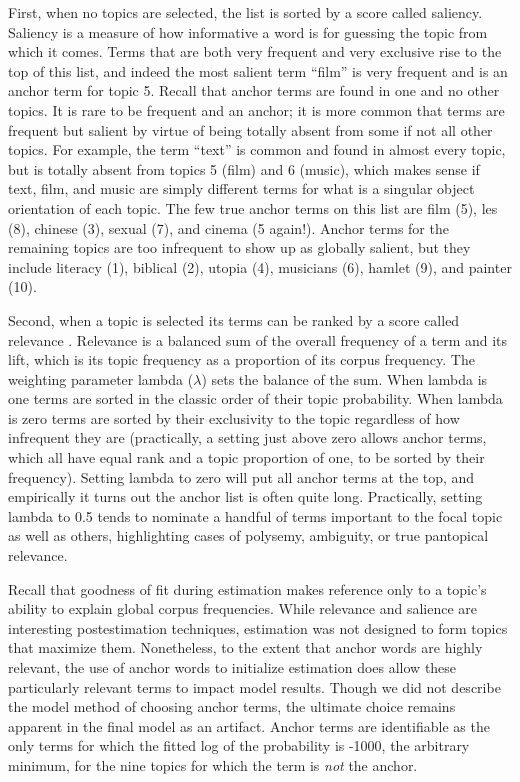 \documentclass[]{book}
\theoremstyle{definition}
\theoremstyle{definition}
\theoremstyle{definition}
\theoremstyle{remark}
\begin{document}
First, when no topics are selected, the list is sorted by a score called
saliency. Saliency is a measure of how informative a word is for
guessing the topic from which it comes. Terms that are both very
frequent and very exclusive rise to the top of this list, and indeed the
most salient term ``film'' is very frequent and is an anchor term for
topic 5. Recall that anchor terms are found in one and no other topics.
It is rare to be frequent and an anchor; it is more common that terms
are frequent but salient by virtue of being totally absent from some if
not all other topics. For example, the term ``text'' is common and found
in almost every topic, but is totally absent from topics 5 (film) and 6
(music), which makes sense if text, film, and music are simply different
terms for what is a singular object orientation of each topic. The few
true anchor terms on this list are film (5), les (8), chinese (3),
sexual (7), and cinema (5 again!). Anchor terms for the remaining topics
are too infrequent to show up as globally salient, but they include
literacy (1), biblical (2), utopia (4), musicians (6), hamlet (9), and
painter (10).

Second, when a topic is selected its terms can be ranked by a score
called relevance \citep[66]{Sievert2014LDAvis}. Relevance is a balanced
sum of the overall frequency of a term and its lift, which is its topic
frequency as a proportion of its corpus frequency. The weighting
parameter lambda (\(\lambda\)) sets the balance of the sum. When lambda
is one terms are sorted in the classic order of their topic probability.
When lambda is zero terms are sorted by their exclusivity to the topic
regardless of how infrequent they are (practically, a setting just above
zero allows anchor terms, which all have equal rank and a topic
proportion of one, to be sorted by their frequency). Setting lambda to
zero will put all anchor terms at the top, and empirically it turns out
the anchor list is often quite long. Practically, setting lambda to 0.5
tends to nominate a handful of terms important to the focal topic as
well as others, highlighting cases of polysemy, ambiguity, or true
pantopical relevance.

Recall that goodness of fit during estimation makes reference only to a
topic's ability to explain global corpus frequencies. While relevance
and salience are interesting postestimation techniques, estimation was
not designed to form topics that maximize them. Nonetheless, to the
extent that anchor words are highly relevant, the use of anchor words to
initialize estimation does allow these particularly relevant terms to
impact model results. Though we did not describe the model method of
choosing anchor terms, the ultimate choice remains apparent in the final
model as an artifact. Anchor terms are identifiable as the only terms
for which the fitted log of the probability is -1000, the arbitrary
minimum, for the nine topics for which the term is \emph{not} the
anchor.
\end{document}
